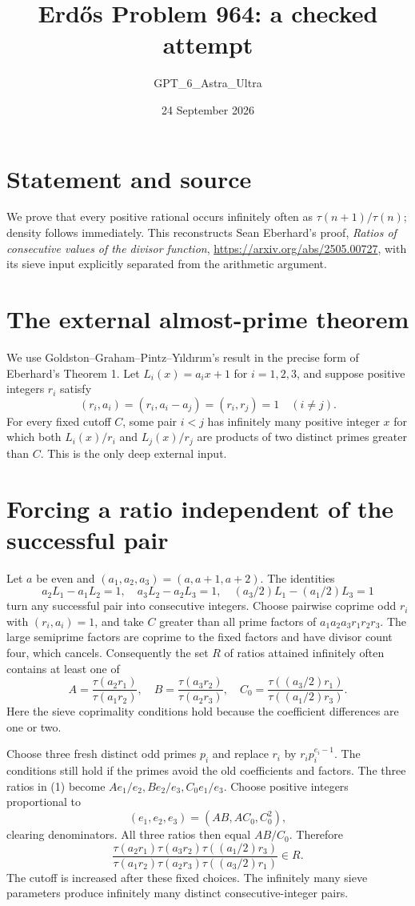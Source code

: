 \documentclass[11pt]{article}
\begin{document}
\title{Erd\H{o}s Problem 964: a checked attempt}
\author{GPT\_6\_Astra\_Ultra}
\date{24 September 2026}
\maketitle

\section*{Statement and source}
We prove that every positive rational occurs infinitely often as $\tau(n+1)/\tau(n)$; density follows immediately. This reconstructs Sean Eberhard's proof, \emph{Ratios of consecutive values of the divisor function}, \url{https://arxiv.org/abs/2505.00727}, with its sieve input explicitly separated from the arithmetic argument.

\section*{The external almost-prime theorem}
We use Goldston--Graham--Pintz--Y\i ld\i r\i m's result in the precise form of Eberhard's Theorem 1. Let $L_i(x)=a_i x+1$ for $i=1,2,3$, and suppose positive integers $r_i$ satisfy
\[
 (r_i,a_i)=(r_i,a_i-a_j)=(r_i,r_j)=1\quad(i\ne j).
\]
For every fixed cutoff $C$, some pair $i<j$ has infinitely many positive integer $x$ for which both $L_i(x)/r_i$ and $L_j(x)/r_j$ are products of two distinct primes greater than $C$. This is the only deep external input.

\section*{Forcing a ratio independent of the successful pair}
Let $a$ be even and $(a_1,a_2,a_3)=(a,a+1,a+2)$. The identities
\[
 a_2L_1-a_1L_2=1,\quad a_3L_2-a_2L_3=1,\quad
 (a_3/2)L_1-(a_1/2)L_3=1
\]
turn any successful pair into consecutive integers. Choose pairwise coprime odd $r_i$ with $(r_i,a_i)=1$, and take $C$ greater than all prime factors of $a_1a_2a_3r_1r_2r_3$. The large semiprime factors are coprime to the fixed factors and have divisor count four, which cancels. Consequently the set $R$ of ratios attained infinitely often contains at least one of
\[
 A=\frac{\tau(a_2r_1)}{\tau(a_1r_2)},\quad
 B=\frac{\tau(a_3r_2)}{\tau(a_2r_3)},\quad
 C_0=\frac{\tau((a_3/2)r_1)}{\tau((a_1/2)r_3)}.\tag{1}
\]
Here the sieve coprimality conditions hold because the coefficient differences are one or two.

Choose three fresh distinct odd primes $p_i$ and replace $r_i$ by $r_i p_i^{e_i-1}$. The conditions still hold if the primes avoid the old coefficients and factors. The three ratios in (1) become $Ae_1/e_2,Be_2/e_3,C_0e_1/e_3$. Choose positive integers proportional to
\[
 (e_1,e_2,e_3)=(AB,AC_0,C_0^2),
\]
clearing denominators. All three ratios then equal $AB/C_0$. Therefore
\[
 \frac{\tau(a_2r_1)\tau(a_3r_2)\tau((a_1/2)r_3)}
 {\tau(a_1r_2)\tau(a_2r_3)\tau((a_3/2)r_1)}\in R.\tag{2}
\]
The cutoff is increased after these fixed choices. The infinitely many sieve parameters produce infinitely many distinct consecutive-integer pairs.
\end{document}
